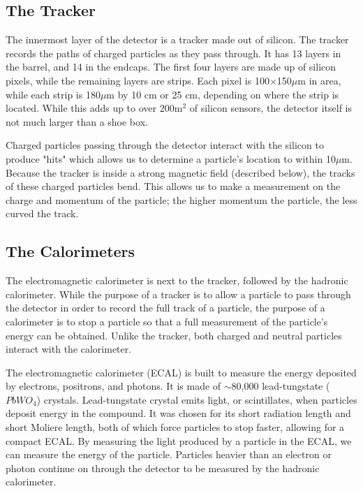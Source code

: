 \subsection{The Tracker}

The innermost layer of the detector is a tracker made out of silicon. The tracker records the paths of charged particles as they pass through. It has 13 layers in the barrel, and 14 in the endcaps. The first four layers are made up of silicon pixels, while the remaining layers are strips. Each pixel is 100$\times$150$\mu$m in area, while each strip is 180$\mu$m by 10 cm or 25 cm, depending on where the strip is located. While this adds up to over 200$\text{m}^{2}$ of silicon sensors, the detector itself is not much larger than a shoe box. 

Charged particles passing through the detector interact with the silicon to produce "hits" which allows us to determine a particle's location to within 10$\mu$m. Because the tracker is inside a strong magnetic field (described below), the tracks of these charged particles bend. This allows us to make a measurement on the charge and momentum of the particle; the higher momentum the particle, the less curved the track.
\vspace{5mm}

\subsection{The Calorimeters}

The electromagnetic calorimeter is next to the tracker, followed by the hadronic calorimeter. While the purpose of a tracker is to allow a particle to pass through the detector in order to record the full track of a particle, the purpose of a calorimeter is to stop a particle so that a full measurement of the particle's energy can be obtained. Unlike the tracker, both charged and neutral particles interact with the calorimeter.

The electromagnetic calorimeter (ECAL) is built to measure the energy deposited by electrons, positrons, and photons. It is made of $\sim$80,000 lead-tungstate ($PbWO_4$) crystals. Lead-tungstate crystal emits light, or scintillates, when particles deposit energy in the compound. It was chosen for its short radiation length and short Moliere length, both of which force particles to stop faster, allowing for a compact ECAL. By measuring the light produced by a particle in the ECAL, we can measure the energy of the particle. Particles heavier than an electron or photon continue on through the detector to be measured by the hadronic calorimeter.

